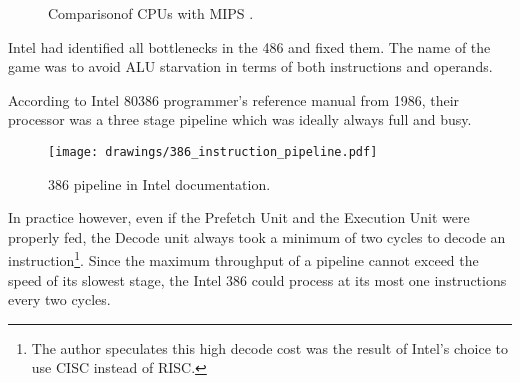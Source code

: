 \par
\begin{figure}[H]
\centering
   \caption{Comparison\protect\footnotemark of CPUs with MIPS \protect\footnotemark.}
 \end{figure}

Intel had identified all bottlenecks in the 486 and fixed them. The name of the game was to avoid ALU starvation in terms of both instructions and operands.\\
\par
{}
\par













According to Intel 80386 programmer's reference manual from 1986, their processor was a three stage pipeline which was ideally always full and busy.\\
\par
\begin{figure}[H]
\centering
\texttt{[image: drawings/386\_instruction\_pipeline.pdf]}
\caption{386 pipeline in Intel documentation.}
\end{figure}

\par
In practice however, even if the Prefetch Unit and the Execution Unit were properly fed, the Decode unit always took a minimum of two cycles to decode an instruction\footnote{The author speculates this high decode cost was the result of Intel's choice to use CISC instead of RISC.}. Since the maximum throughput of a pipeline cannot exceed the speed of its slowest stage, the Intel 386 could process at its most one instructions every two cycles.\\
\par

